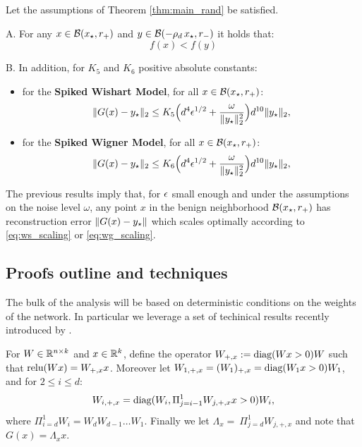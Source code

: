 \begin{prop}\label{prop:rand_localmin}
	Let the assumptions of Theorem  \ref{thm:main_rand} be satisfied.
	
	A. For any $x \in \mathcal{B}({x_{\star}}, r_+)$ and $y \in \mathcal{B}(- \rho_d \, {x_{\star}}, r_-)$ it holds that:
	\[
	f(x) < f(y)
	\]
	
	B. In addition, for $K_5$ and $K_6$ positive absolute constants:
	\begin{itemize}
		\item for the \textbf{Spiked Wishart Model}, for all $x \in \mathcal{B}({x_{\star}}, r_+)$:
		\[
		\| G(x) - {{y_\star}}\|_2	\leq K_5 \Big(d^4 {\epsilon^{1/2}} +  \frac{\omega}{\| {{y_\star}}\|_2^2 } \Big) d^{10} \|{{y_\star}}\|_2,
		\]
		
		\item  for the \textbf{Spiked Wigner Model}, for all $x \in \mathcal{B}({x_{\star}}, r_+)$:
		\[
		\| G(x) - {{y_\star}}\|_2	\leq K_6 \Big(d^4 {\epsilon^{1/2}} + \frac{\omega}{\| {{y_\star}}\|_2^2 } \Big) d^{10} \|{{y_\star}}\|_2,
		\]
		
	\end{itemize}
	
\end{prop}

The previous results imply that, for $\epsilon$ small enough and under the assumptions on the noise level $\omega$, any point $x$ in the benign neighborhood $\mathcal{B}({x_{\star}}, r_+)$ has reconstruction error $\| G(x) - {{y_\star}}\|$ which scales optimally according to \eqref{eq:ws_scaling} or \eqref{eq:wg_scaling}.

\subsection{Proofs outline and techniques}


The bulk of the analysis will be based on deterministic conditions on 
the weights of the network.
In particular we leverage a set of techinical results 
recently introduced by \cite{hand2017global}.

For $W \in \mathbb{R}^{n \times k}$ and $x \in \mathbb{R}^k$, define the operator $W_{+,x} := \text{diag}(W x > 0) W$ such that $\text{relu}(W x) = W_{+,x} x$.  Moreover let $W_{1,+,x} = (W_1)_{+,x} = \text{diag}(W_1 x > 0) W_1$, and for $ 2 \leq i \leq d$:
\[
W_{i,+,x} = \text{diag}(W_i, \Pi_{j=i-1}^{1} W_{j,+,x}  x > 0)W_i, 
\]
where $\Pi_{i=d}^{1} W_{i} = W_d W_{d-1} \dots W_1$. 
Finally we let $\Lambda_x=~\Pi_{j=d}^{1} W_{j,+,x} $
and note that $G(x) = \Lambda_x x$.

